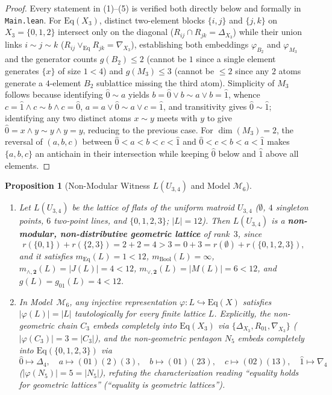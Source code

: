 \documentclass[11pt]{article}
\newtheorem{proposition}[theorem]{Proposition}
\theoremstyle{definition}
\theoremstyle{remark}
\newcommand{\Eq}{\mathrm{Eq}}
\newcommand{\BoolTwo}{\mathbf{2}}
\begin{document}
\begin{proof}
Every statement in (1)--(5) is verified both directly below and formally in \texttt{Main.lean}. For $\Eq(X_3)$, distinct two-element blocks $\{i,j\}$ and $\{j,k\}$ on $X_3 = \{0,1,2\}$ intersect only on the diagonal ($R_{ij} \cap R_{jk} = \Delta_{X_3}$) while their union links $i \sim j \sim k$ ($R_{ij} \vee_{\Eq} R_{jk} = \nabla_{X_3}$), establishing both embeddings $\varphi_{B_2}$ and $\varphi_{M_3}$ and the generator counts $g(B_2) \le 2$ (cannot be $1$ since a single element generates $\{x\}$ of size $1 < 4$) and $g(M_3) \le 3$ (cannot be $\le 2$ since any $2$ atoms generate a $4$-element $B_2$ sublattice missing the third atom). Simplicity of $M_3$ follows because identifying $\hat{0} \sim a$ yields $b = \hat{0} \vee b \sim a \vee b = \hat{1}$, whence $c = \hat{1} \wedge c \sim b \wedge c = \hat{0}$, $a = a \vee \hat{0} \sim a \vee c = \hat{1}$, and transitivity gives $\hat{0} \sim \hat{1}$; identifying any two distinct atoms $x \sim y$ meets with $y$ to give $\hat{0} = x \wedge y \sim y \wedge y = y$, reducing to the previous case. For $\dim(M_3) = 2$, the reversal of $(a,b,c)$ between $\hat{0} < a < b < c < \hat{1}$ and $\hat{0} < c < b < a < \hat{1}$ makes $\{a,b,c\}$ an antichain in their intersection while keeping $\hat{0}$ below and $\hat{1}$ above all elements.
\end{proof}

\begin{proposition}[Non-Modular Witness $L(U_{3,4})$ and Model $\mathcal{M}_6$]
\label{prop:u34-and-m6}
\begin{enumerate}
\item[(1)] Let $L(U_{3,4})$ be the lattice of flats of the uniform matroid $U_{3,4}$ ($\emptyset$, $4$ singleton points, $6$ two-point lines, and $\{0,1,2,3\}$; $|L|=12$). Then $L(U_{3,4})$ is a \textbf{non-modular, non-distributive geometric lattice} of rank~$3$, since
\[
  r(\{0,1\}) + r(\{2,3\}) = 2 + 2 = 4 > 3 = 0 + 3 = r(\emptyset) + r(\{0,1,2,3\}),
\]
and it satisfies $m_{\Eq}(L)=1<12$, $m_{\mathrm{Bool}}(L)=\infty$, $m_{\wedge,\BoolTwo}(L) = |J(L)| = 4 < 12$, $m_{\vee,\BoolTwo}(L) = |M(L)| = 6 < 12$, and $g(L) = g_{01}(L) = 4 < 12$.
\item[(2)] In Model~$\mathcal{M}_6$, any injective representation $\varphi \colon L \hookrightarrow \Eq(X)$ satisfies $|\varphi(L)| = |L|$ tautologically for \emph{every} finite lattice $L$. Explicitly, the non-geometric chain $C_3$ embeds completely into $\Eq(X_3)$ via $\{\Delta_{X_3}, R_{01}, \nabla_{X_3}\}$ ($|\varphi(C_3)| = 3 = |C_3|$), and the non-geometric pentagon $N_5$ embeds completely into $\Eq(\{0,1,2,3\})$ via
\[
  \hat{0} \mapsto \Delta_4,\quad
  a \mapsto (01)(2)(3),\quad
  b \mapsto (01)(23),\quad
  c \mapsto (02)(13),\quad
  \hat{1} \mapsto \nabla_4
\]
($|\varphi(N_5)| = 5 = |N_5|$), refuting the characterization reading ``equality holds for geometric lattices'' (\emph{``equality is geometric lattices''}).
\end{enumerate}
\end{proposition}
\end{document}
